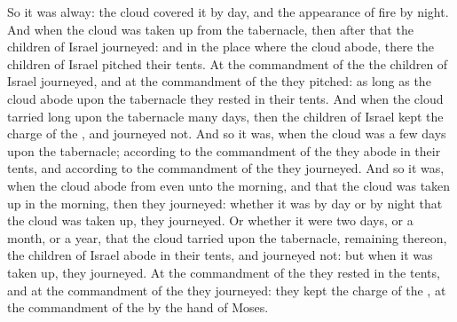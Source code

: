 \begin{biblechapter}
\verse So it was alway: the cloud covered it by day, and the appearance of fire by night.
\verse And when the cloud was taken up from the tabernacle, then after that the children of Israel journeyed: and in the place where the cloud abode, there the children of Israel pitched their tents.
\verse At the commandment of the \LORD the children of Israel journeyed, and at the commandment of the \LORD they pitched: as long as the cloud abode upon the tabernacle they rested in their tents.
\verse And when the cloud tarried long upon the tabernacle many days, then the children of Israel kept the charge of the \LORD, and journeyed not.
\verse And so it was, when the cloud was a few days upon the tabernacle; according to the commandment of the \LORD they abode in their tents, and according to the commandment of the \LORD they journeyed.
\verse And so it was, when the cloud abode from even unto the morning, and that the cloud was taken up in the morning, then they journeyed: whether it was by day or by night that the cloud was taken up, they journeyed.
\verse Or whether it were two days, or a month, or a year, that the cloud tarried upon the tabernacle, remaining thereon, the children of Israel abode in their tents, and journeyed not: but when it was taken up, they journeyed.
\verse At the commandment of the \LORD they rested in the tents, and at the commandment of the \LORD they journeyed: they kept the charge of the \LORD, at the commandment of the \LORD by the hand of Moses.
\end{biblechapter}

